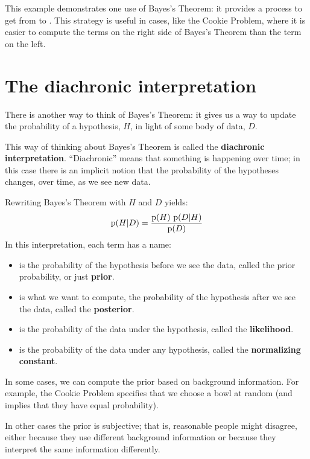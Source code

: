 \documentclass[12pt]{book}
\begin{document}
This example demonstrates one use of Bayes's Theorem: it provides
a process to get from  to .  This strategy is useful
in cases, like the Cookie Problem, where it is easier to compute
the terms on the right side of Bayes's Theorem than the term on the
left.


\section{The diachronic interpretation}

There is another way to think of Bayes's Theorem: it gives us a
way to update the probability of a hypothesis, $H$, in light of
some body of data, $D$.

This way of thinking about Bayes's Theorem is called the
{\bf diachronic interpretation}.  ``Diachronic'' means that something
is happening over time; in this case there is an implicit notion
that the probability of the hypotheses changes, over time, as
we see new data.

Rewriting Bayes's Theorem with $H$ and $D$ yields:
%
\[ \mathrm{p}(H|D) = \frac{\mathrm{p}(H)~\mathrm{p}(D|H)}{\mathrm{p}(D)} \]
%
In this interpretation, each term has a name:

\begin{itemize}

\item {} is the probability of the hypothesis before we see
the data, called the prior probability, or just {\bf prior}.

\item {} is what we want to compute, the probability of
the hypothesis after we see the data, called the {\bf posterior}.
 
\item {} is the probability of the data under the hypothesis,
called the {\bf likelihood}.

\item {} is the probability of the data under any hypothesis,
called the {\bf normalizing constant}.

\end{itemize}

In some cases, we can compute the prior
based on background information.  For example, the Cookie
Problem specifies that we choose a bowl at random (and implies
that they have equal probability).

In other cases the prior
is subjective; that is, reasonable people might disagree,
either because they use different background information
or because they interpret the same information differently.
\end{document}
